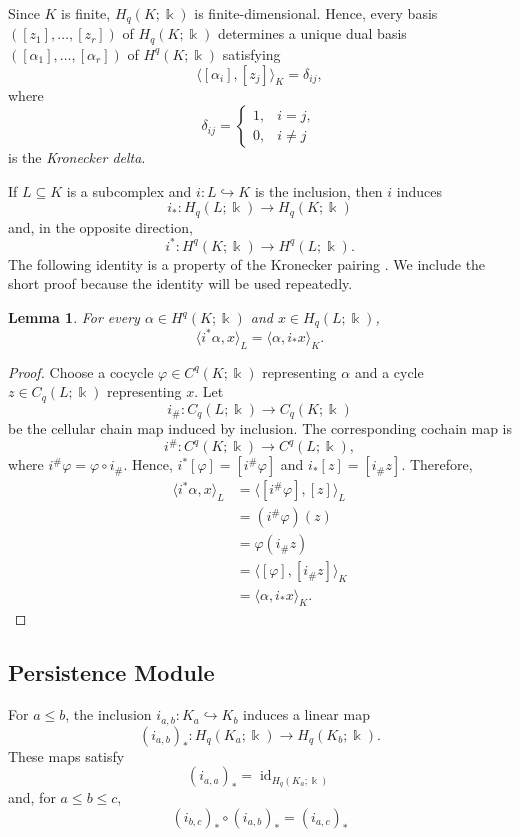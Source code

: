 \documentclass[11pt]{article}
\theoremstyle{paperdefinition}
\theoremstyle{paperplain}
\newtheorem{lemma}[definition]{Lemma}
\theoremstyle{paperremark}
\begin{document}
Since $K$ is finite, $H_q(K;\Bbbk)$ is finite-dimensional. Hence, every basis $([z_1],\ldots,[z_r])$ of $H_q(K;\Bbbk)$ determines a unique dual basis $([\alpha_1],\ldots,[\alpha_r])$ of $H^q(K;\Bbbk)$ satisfying
\[
\langle[\alpha_i],[z_j]\rangle_K=\delta_{ij},
\]
where
\[
\delta_{ij} =
\begin{cases}
1,& i=j,\\
0,& i\neq j
\end{cases}
\]
is the \emph{Kronecker delta}.

If $L\subseteq K$ is a subcomplex and $i:L\hookrightarrow K$ is the inclusion, then $i$ induces
\[
i_*:H_q(L;\Bbbk)\longrightarrow H_q(K;\Bbbk)
\]
and, in the opposite direction,
\[
i^*:H^q(K;\Bbbk)\longrightarrow H^q(L;\Bbbk).
\]
The following identity is a property of the Kronecker pairing
\cite{hatcher2002algebraic}. We include the short proof because the identity
will be used repeatedly.

\begin{lemma}
\label{lem:kronecker-naturality}
For every $\alpha\in H^q(K;\Bbbk)$ and $x\in H_q(L;\Bbbk)$,
\[
\langle i^*\alpha,x\rangle_L
=
\langle\alpha,i_*x\rangle_K.
\]
\end{lemma}

\begin{proof}
Choose a cocycle $\varphi\in C^q(K;\Bbbk)$ representing $\alpha$ and a cycle $z\in C_q(L;\Bbbk)$ representing $x$. Let
\[
i_\#:C_q(L;\Bbbk)\longrightarrow C_q(K;\Bbbk)
\]
be the cellular chain map induced by inclusion. The corresponding cochain map is 
\[
i^\#:C^q(K;\Bbbk)\longrightarrow C^q(L;\Bbbk),
\]
where $i^\#\varphi=\varphi\circ i_\#$. Hence, $i^*[\varphi] = [i^\#\varphi]$ and $i_*[z] = [i_\# z]$. Therefore,
\[
\begin{aligned}
\langle i^*\alpha,x\rangle_L
&=\langle[i^\#\varphi],[z]\rangle_L\\
&=(i^\#\varphi)(z)\\
&=\varphi(i_\#z)\\
&=\langle[\varphi],[i_\#z]\rangle_K\\
&=\langle\alpha,i_*x\rangle_K.
\end{aligned}
\]
\end{proof}

\subsection{Persistence Module} 
\label{subsec:persistence-modules}

For $a\leq b$, the inclusion $i_{a,b}:K_a\hookrightarrow K_b$ induces a linear map
\[
(i_{a,b})_*: H_q(K_a;\Bbbk) \longrightarrow H_q(K_b;\Bbbk).
\]
These maps satisfy
\[
(i_{a,a})_*=\operatorname{id}_{H_q(K_a;\Bbbk)}
\]
and, for $a\leq b\leq c$,
\[
(i_{b,c})_*\circ(i_{a,b})_*=(i_{a,c})_*
\]
\end{document}
